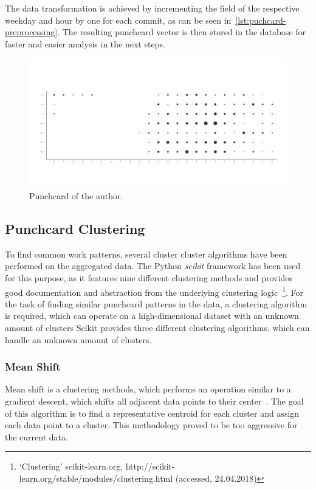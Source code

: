 The data transformation is achieved by incrementing the field of the respective weekday and hour by one for each commit, as can be seen in~\ref{lst:puchcard-preprocessing}.
The resulting punchcard vector is then stored in the database for faster and easier analysis in the next steps.

\begin{figure}[H]
    \includegraphics[scale=0.32]{./graphs/analysis/ordered-punchcard}
    \centering
    \caption{Punchcard of the author.}\label{fig:working-hour-rhythm-author}
\end{figure}



\subsection{Punchcard Clustering}

To find common work patterns, several cluster cluster algorithms have been performed on the aggregated data.
The Python \emph{scikit} framework has been used for this purpose, as it features nine different clustering methods and provides good documentation and abstraction from the underlying clustering logic~\footnote{`Clustering' scikit-learn.org, http://scikit-learn.org/stable/modules/clustering.html (accessed, 24.04.2018)}.
For the task of finding similar punchcard patterns in the data, a clustering algorithm is required, which can operate on a high-dimensional dataset with an unknown amount of clusters
Scikit provides three different clustering algorithms, which can handle an unknown amount of clusters.

\subsubsection{Mean Shift}\label{mean-shift}
Mean shift is a clustering methods, which performs an operation similar to a gradient descent, which shifts all adjacent data points to their center~\cite{article:mean-shift}.
The goal of this algorithm is to find a representative centroid for each cluster and assign each data point to a cluster.
This methodology proved to be too aggressive for the current data.

